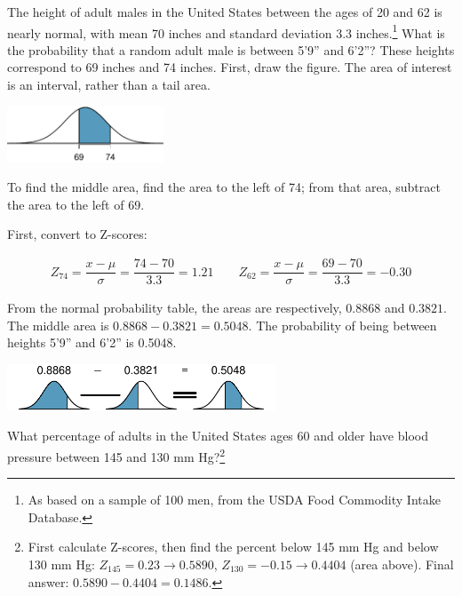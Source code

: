 \begin{example}{The height of adult males in the United States between the ages of 20 and 62 is nearly normal, with mean 70 inches and standard deviation 3.3 inches.\footnote{As based on a sample of 100 men, from the USDA Food Commodity Intake Database.} What is the probability that a random adult male is between 5'9'' and 6'2''?}
	These heights correspond to 69 inches and 74 inches. First, draw the figure. The area of interest is an interval, rather than a tail area.\textC{\vspace{-2mm}}
	\begin{center}
		\includegraphics[width=0.35\textwidth]{ch_distributions_oi_biostat/figures/between59And62/between59And62}\textC{\vspace{-2mm}}
	\end{center}
	To find the middle area, find the area to the left of 74; from that area, subtract the area to the left of 69.
	
	First, convert to Z-scores:
	
	\begin{align*}
	Z_{74} = \dfrac{x-\mu}{\sigma} = \dfrac{74-70}{3.3} = 1.21 \qquad Z_{62} = \dfrac{x-\mu}{\sigma} = \dfrac{69-70}{3.3} = -0.30
	\end{align*}
	
	From the normal probability table, the areas are respectively, $0.8868$ and $0.3821$. The middle area is $0.8868 - 0.3821 = 0.5048$. The probability of being between heights 5'9'' and 6'2'' is 0.5048.
\textC{\vspace{-2mm}}
	\begin{center}
		\includegraphics[width=0.6\textwidth]{ch_distributions_oi_biostat/figures/subtracting2Areas/subtracting2Areas}\textC{\vspace{-2mm}}
	\end{center}

\end{example}

\begin{exercise}
	What percentage of adults in the United States ages 60 and older have blood pressure between 145 and 130 mm Hg?\footnote{First calculate Z-scores, then find the percent below 145 mm Hg and below 130 mm Hg: $Z_{145} = 0.23 \to 0.5890$, $Z_{130} = -0.15 \to 0.4404$ (area above). Final answer: $0.5890 - 0.4404 = 0.1486$.}
\end{exercise}

